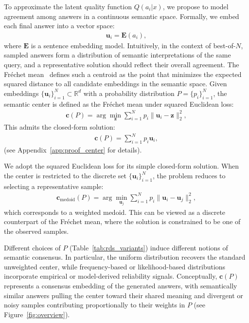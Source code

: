 To approximate the latent quality function $Q(a_i|x)$, we propose to model agreement among answers in a continuous semantic space. Formally, we embed each final answer into a vector space:
\begin{align}
    \mathbf{u}_i = \mathbf{E}(a_i),
\end{align}
where $\mathbf{E}$ is a sentence embedding model. 
Intuitively, in the context of best-of-$N$, sampled answers form a distribution of semantic interpretations of the same query, and a representative solution should reflect their overall agreement. The Fréchet mean~\citep{fletcher} defines such a centroid as the point that minimizes the expected squared distance to all candidate embeddings in the semantic space. Given embeddings $\{\mathbf{u}_i\}_{i=1}^N \subset \mathbb{R}^d$ with a probability distribution $P{=}\{p_i\}_{i=1}^N$, the semantic center is defined as the Fréchet mean under squared Euclidean loss:
\begin{align}
    \mathbf{c}(P) = \arg\min_{\mathbf{z}} \sum_{i=1}^N p_i \|\mathbf{u}_i - \mathbf{z}\|_2^2,
        \label{eq:center}
\end{align}
This admits the closed-form solution:
\begin{align}
    \mathbf{c}(P) = \sum_{i=1}^N p_i \mathbf{u}_i,
\end{align}
(see Appendix~\ref{app:proof_center} for details).

We adopt the squared Euclidean loss for its simple closed-form solution. When the center is restricted to the discrete set $\{\mathbf{u}_i\}_{i=1}^N$, the problem reduces to selecting a representative sample:
\begin{align}
\mathbf{c}_{\text{medoid}}(P)
= \arg\min_{\mathbf{u}_j} \sum_{i=1}^N p_i \|\mathbf{u}_i - \mathbf{u}_j\|_2^2,
\end{align}
which corresponds to a weighted medoid. This can be viewed as a discrete counterpart of the Fréchet mean, where the solution is constrained to be one of the observed samples.

Different choices of $P$ (Table~\ref{tab:rds_variants}) induce different notions of semantic consensus. In particular, the uniform distribution recovers the standard unweighted center, while frequency-based or likelihood-based distributions incorporate empirical or model-derived reliability signals.
Conceptually, $\mathbf{c}(P)$ represents a consensus embedding of the generated answers, with semantically similar answers pulling the center toward their shared meaning and divergent or noisy samples contributing proportionally to their weights in $P$ (see Figure~\ref{fig:overview}).


